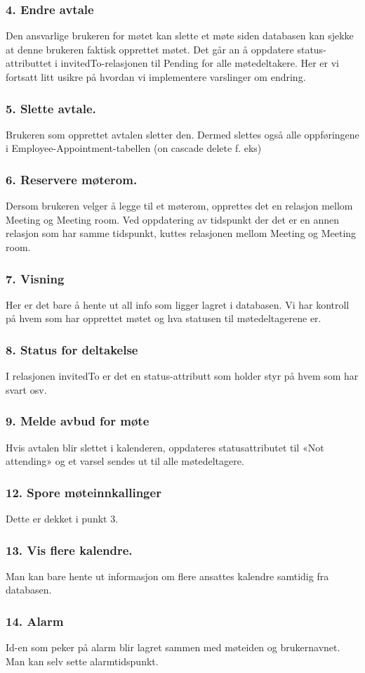 \documentclass[a4paper,12pt, norsk]{article}
\begin{document}
\subsubsection*{4. Endre avtale}
Den ansvarlige brukeren for møtet kan slette et møte siden databasen kan sjekke at denne brukeren faktisk opprettet møtet. Det går an å oppdatere status-attributtet i invitedTo-relasjonen til Pending for alle møtedeltakere. Her er vi fortsatt litt usikre på hvordan vi implementere varslinger om endring. 

\subsubsection*{5. Slette avtale.}
Brukeren som opprettet avtalen sletter den. Dermed slettes også alle oppføringene i Employee-Appointment-tabellen (on cascade delete f. eks)

\subsubsection*{6. Reservere møterom.}
Dersom brukeren velger å legge til et møterom, opprettes det en relasjon mellom Meeting og Meeting room. Ved oppdatering av tidspunkt der det er en annen relasjon som har samme tidspunkt, kuttes relasjonen mellom Meeting og Meeting room.

\subsubsection*{7. Visning}
Her er det bare å hente ut all info som ligger lagret i databasen. Vi har kontroll på hvem som har opprettet møtet og hva statusen til møtedeltagerene er. 

\subsubsection*{8. Status for deltakelse}
I relasjonen invitedTo er det en status-attributt som holder styr på hvem som har svart osv. 

\subsubsection*{9. Melde avbud for møte}
Hvis avtalen blir slettet i kalenderen, oppdateres statusattributet til «Not attending» og et varsel sendes ut til alle møtedeltagere. 

\subsubsection*{12. Spore møteinnkallinger }
Dette er dekket i punkt 3. 

\subsubsection*{13. Vis flere kalendre. }
Man kan bare hente ut informasjon om flere ansattes kalendre samtidig fra databasen.

\subsubsection*{14. Alarm}
Id-en som peker på alarm blir lagret sammen med møteiden og brukernavnet. Man kan selv sette alarmtidspunkt. 
\end{document}
